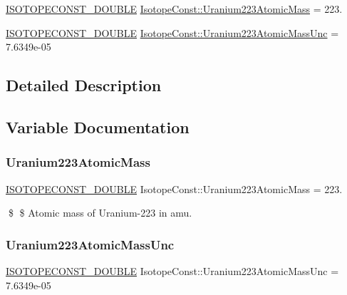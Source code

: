 \begin{DoxyCompactItemize}
\item 
\mbox{\hyperlink{group___isotope_const-_macros_ga8f45a7272ce02c0b4c65c44636ed719a}{I\+S\+O\+T\+O\+P\+E\+C\+O\+N\+S\+T\+\_\+\+D\+O\+U\+B\+LE}} \mbox{\hyperlink{group___isotope_const-_uranium-_u223_ga64acf98f32f554fb79a14b69a1cdafd8}{Isotope\+Const\+::\+Uranium223\+Atomic\+Mass}} = 223.
\item 
\mbox{\hyperlink{group___isotope_const-_macros_ga8f45a7272ce02c0b4c65c44636ed719a}{I\+S\+O\+T\+O\+P\+E\+C\+O\+N\+S\+T\+\_\+\+D\+O\+U\+B\+LE}} \mbox{\hyperlink{group___isotope_const-_uranium-_u223_gad5dfc5dd457265ee6e2fe20cd6347895}{Isotope\+Const\+::\+Uranium223\+Atomic\+Mass\+Unc}} = 7.\+6349e-\/05
\end{DoxyCompactItemize}


\subsection{Detailed Description}


\subsection{Variable Documentation}
\mbox{\label{group___isotope_const-_uranium-_u223_ga64acf98f32f554fb79a14b69a1cdafd8}} 
\subsubsection{\texorpdfstring{Uranium223\+Atomic\+Mass}{Uranium223AtomicMass}}
{\footnotesize\ttfamily \mbox{\hyperlink{group___isotope_const-_macros_ga8f45a7272ce02c0b4c65c44636ed719a}{I\+S\+O\+T\+O\+P\+E\+C\+O\+N\+S\+T\+\_\+\+D\+O\+U\+B\+LE}} Isotope\+Const\+::\+Uranium223\+Atomic\+Mass = 223.}

\$ \$ Atomic mass of Uranium-\/223 in amu. \mbox{\label{group___isotope_const-_uranium-_u223_gad5dfc5dd457265ee6e2fe20cd6347895}} 
\subsubsection{\texorpdfstring{Uranium223\+Atomic\+Mass\+Unc}{Uranium223AtomicMassUnc}}
{\footnotesize\ttfamily \mbox{\hyperlink{group___isotope_const-_macros_ga8f45a7272ce02c0b4c65c44636ed719a}{I\+S\+O\+T\+O\+P\+E\+C\+O\+N\+S\+T\+\_\+\+D\+O\+U\+B\+LE}} Isotope\+Const\+::\+Uranium223\+Atomic\+Mass\+Unc = 7.\+6349e-\/05}

